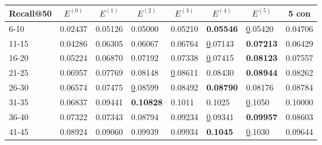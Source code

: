 \begin{table*}[]
    \begin{tabular}{|l|l|l|l|l|l|l||l|}
        \hline
        Recall@50 & \multicolumn{1}{c|}{$E^{(0)}$} & \multicolumn{1}{c|}{$E^{(1)}$} & \multicolumn{1}{c|}{$E^{(2)}$} & \multicolumn{1}{c|}{$E^{(3)}$} & \multicolumn{1}{c|}{$E^{(4)}$} & \multicolumn{1}{c||}{$E^{(5)}$} & \multicolumn{1}{c|}{5 con} \\ \hline
        6-10      & 0.02437                        & 0.05126                        & 0.05000                        & 0.05210                        & \textbf{0.05546}               & {\ul 0.05420}                   & 0.04706                    \\ \hline
        11-15     & 0.04286                        & 0.06305                        & 0.06067                        & 0.06764                        & {\ul 0.07143}                  & \textbf{0.07213}                & 0.06429                    \\ \hline
        16-20     & 0.05224                        & 0.06870                        & 0.07192                        & 0.07338                        & {\ul 0.07415}                  & \textbf{0.08123}                & 0.07557                    \\ \hline
        21-25     & 0.06957                        & 0.07769                        & 0.08148                        & {\ul 0.08611}                  & 0.08430                        & \textbf{0.08944}                & 0.08262                    \\ \hline
        26-30     & 0.06574                        & 0.07475                        & {\ul 0.08599}                  & 0.08492                        & \textbf{0.08790}               & 0.08176                         & 0.08784                    \\ \hline
        31-35     & 0.06837                        & 0.09441                        & \textbf{0.10828}               & 0.1011                         & 0.1025                         & {\ul 0.1050}                    & 0.10000                    \\ \hline
        36-40     & 0.07322                        & 0.07343                        & 0.08794                        & 0.09234                        & {\ul 0.09341}                  & \textbf{0.09957}                & 0.08603                    \\ \hline
        41-45     & 0.08924                        & 0.09060                        & 0.09939                        & 0.09934                        & \textbf{0.1045}                & {\ul 0.1030}                    & 0.09644                    \\ \hline

\end{tabular}
\end{table*}
